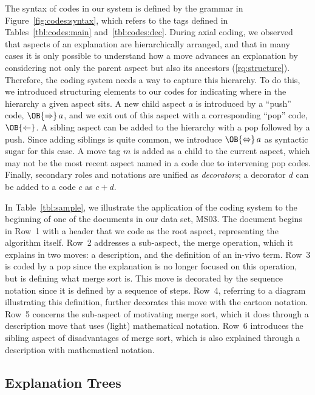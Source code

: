 \documentclass[sigconf]{acmart}
\newcommand{\Push}{\OB{\Rightarrow}}
\newcommand{\Pop}{\OB{\Leftarrow}}
\newcommand{\PopPush}{\OB{\Leftrightarrow}}
\begin{document}
The syntax of codes in our system is defined by the grammar in
Figure~\ref{fig:codes:syntax}, which refers to the tags defined in
Tables~\ref{tbl:codes:main} and~\ref{tbl:codes:dec}.
%
During axial coding, we observed that aspects of an explanation are
hierarchically arranged, and that in many cases it is only possible to
understand how a move advances an explanation by considering not only the
parent aspect but also its ancestors (\ref{rq:structure}).
%
Therefore, the coding system needs a way to capture this hierarchy. To do this,
we introduced structuring elements to our codes for indicating where in the
hierarchy a given aspect sits.
%
A new child aspect $a$ is introduced by a ``push'' code, $\Push\,a$, and we
exit out of this aspect with a corresponding ``pop'' code, $\Pop$. A sibling
aspect can be added to the hierarchy with a pop followed by a push. Since
adding siblings is quite common, we introduce $\PopPush\,a$ as syntactic sugar
for this case.
%
A move tag $m$ is added as a child to the current aspect, which may not be the
most recent aspect named in a code due to intervening pop codes.
%
Finally, secondary roles and notations are unified as \emph{decorators}; a
decorator $d$ can be added to a code $c$ as $c+d$.





In Table~\ref{tbl:sample}, we illustrate the application of the coding system
to the beginning of one of the documents in our data set, MS03.
%
The document begins in Row~1 with a header that we code as the root aspect,
representing the algorithm itself. Row~2 addresses a sub-aspect, the merge
operation, which it explains in two moves: a description, and the definition of
an in-vivo term.
%
Row~3 is coded by a pop since the explanation is no longer focused on this
operation, but is defining what merge sort is. This move is decorated by the
sequence notation since it is defined by a sequence of steps.
%
Row~4, referring to a diagram illustrating this definition, further decorates
this move with the cartoon notation.
%
Row~5 concerns the sub-aspect of motivating merge sort, which it does through a
description move that uses (light) mathematical notation.
%
Row~6 introduces the sibling aspect of disadvantages of merge sort, which is
also explained through a description with mathematical notation.



\subsection{Explanation Trees}
\label{sec:res:xopTree}
\end{document}
